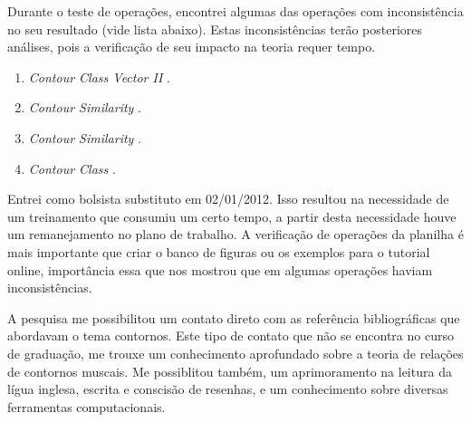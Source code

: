 \documentclass[11pt]{article}
\newcommand{\eng}[1]{\textit{#1}}
\begin{document}
Durante o teste de operações, encontrei algumas das operações com
inconsistência no seu resultado (vide lista abaixo). Estas inconsistências terão posteriores
análises, pois a verificação de seu impacto na teoria requer tempo.


\begin{enumerate}
\item \eng{Contour Class Vector II} \cite[p. 241]{Friedmann1985}.
\item \eng{Contour Similarity} \cite[p. 242]{Quinn1997}.
\item \eng{Contour Similarity} \cite[p. 262]{Quinn1997}.
\item \eng{Contour Class} \cite[p. 113]{Schultz2008}.
\end{enumerate}

Entrei como bolsista substituto em 02/01/2012. Isso resultou na
necessidade de um treinamento que consumiu um certo tempo, a partir
desta necessidade houve um remanejamento no plano de trabalho.
A verificação de operações da planilha é mais importante que criar o
banco de figuras ou os exemplos para o tutorial online, importância
essa que nos mostrou que em algumas operações haviam inconsistências.

A pesquisa me possibilitou um contato direto com as referência bibliográficas que abordavam
o tema contornos.
Este tipo de contato que não se encontra no curso de graduação,
me trouxe um conhecimento aprofundado sobre a teoria de relações de contornos muscais.
Me possiblitou também, um aprimoramento na leitura da lígua inglesa, escrita e conscisão
de resenhas, e um conhecimento sobre diversas ferramentas computacionais.


\end{document}
